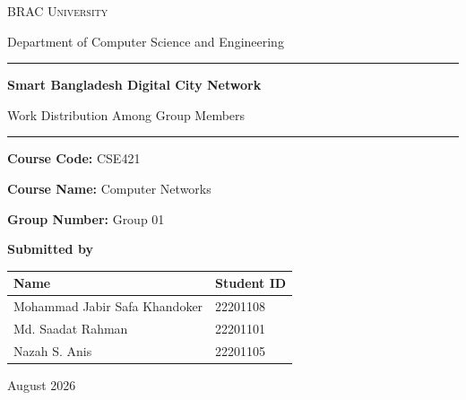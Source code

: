 \documentclass[11pt,a4paper]{article}
\newcommand{\memA}{Mohammad Jabir Safa Khandoker}
\newcommand{\idA}{22201108}
\newcommand{\memB}{Md. Saadat Rahman}
\newcommand{\idB}{22201101}
\newcommand{\memC}{Nazah S. Anis}
\newcommand{\idC}{22201105}
\begin{document}
\begin{titlepage}
\centering
\vspace*{6mm}


{\LARGE\scshape BRAC University\par}
\vspace{5mm}
{\large Department of Computer Science and Engineering\par}

\vspace{26mm}
{\color{navy}\rule{\linewidth}{1.2pt}}
\vspace{8mm}

{\huge\bfseries Smart Bangladesh Digital City Network\par}
\vspace{6mm}
{\Large Work Distribution Among Group Members\par}

\vspace{8mm}
{\color{navy}\rule{\linewidth}{1.2pt}}

\vspace{20mm}
{\large \textbf{Course Code:} CSE421 \par}
\vspace{3mm}
{\large \textbf{Course Name:} Computer Networks \par}
\vspace{3mm}
{\large \textbf{Group Number:} Group 01 \par}

\vspace{18mm}
{\large\bfseries Submitted by\par}
\vspace{5mm}

\begin{tabular}{@{}p{75mm}p{35mm}@{}}
\toprule
\textbf{Name} & \textbf{Student ID} \\
\midrule
\memA & \idA \\
\memB & \idB \\
\memC & \idC \\
\bottomrule
\end{tabular}

\vfill
{\large August 2026\par}
\vspace{4mm}
\end{titlepage}
\end{document}
